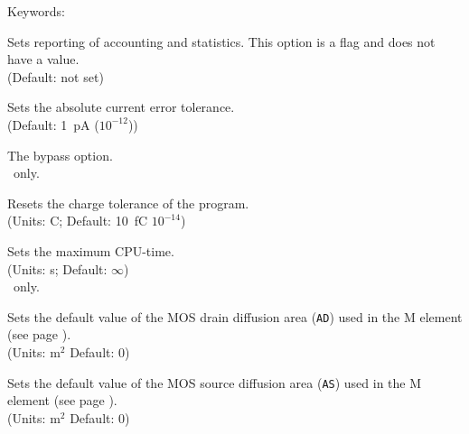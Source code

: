 \noindent Keywords:
\begin{widelist}

Sets reporting of accounting and statistics.
This option is a flag and does not have a value.
\\(Default: not set)

Sets the absolute current error tolerance.
\\(Default: 1~pA ($10^{-12}$))

{
The bypass option.\\
\spicethree\ only.}

Resets  the  charge  tolerance  of  the  program.
\\(Units: C; Default: 10~fC $10^{-14}$)

{
Sets the maximum CPU-time.
\\(Units: s; Default: $\infty$)\\\spicetwo\ only.}

Sets the default value of the  MOS  drain  diffusion  area ({\tt AD})
used in the M element (see page \pageref{Melement}).
\\(Units: m$^2$ Default: 0)

Sets the default value of the MOS  source  diffusion  area ({\tt AS})
used in the M element (see page \pageref{Melement}).
\\(Units: m$^2$ Default: 0)

\end{widelist}

